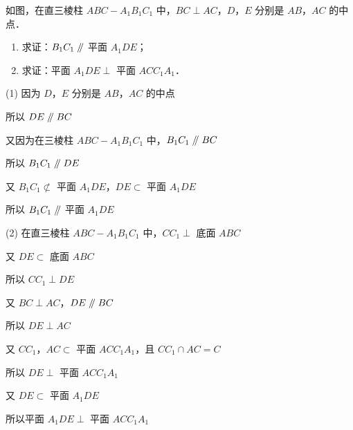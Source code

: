 \begin{example}[\bkstar{2}{5}]
如图，在直三棱柱 $ABC-A_1B_1C_1$ 中，$BC\perp AC$，$D$，$E$ 分别是 $AB$，$AC$ 的中点．
\begin{enumerate}
    \item[(1)] 求证：$B_1C_1\mathrel{/\mkern-5mu/}$ 平面 $A_1DE$；
    \item[(2)] 求证：平面 $A_1DE\perp$ 平面 $ACC_1A_1$．
\end{enumerate}
\end{example}
\begin{solution}
(1) 因为 $D$，$E$ 分别是 $AB$，$AC$ 的中点

所以 $DE\mathrel{/\mkern-5mu/} BC$

又因为在三棱柱 $ABC-A_1B_1C_1$ 中，$B_1C_1\mathrel{/\mkern-5mu/} BC$

所以 $B_1C_1\mathrel{/\mkern-5mu/} DE$

又 $B_1C_1\not\subset$ 平面 $A_1DE$，$DE\subset$ 平面 $A_1DE$

所以 $B_1C_1\mathrel{/\mkern-5mu/}$ 平面 $A_1DE$

(2) 在直三棱柱 $ABC-A_1B_1C_1$ 中，$CC_1\perp$ 底面 $ABC$

又 $DE\subset$ 底面 $ABC$

所以 $CC_1\perp DE$

又 $BC\perp AC$，$DE\mathrel{/\mkern-5mu/} BC$

所以 $DE\perp AC$

又 $CC_1$，$AC\subset$ 平面 $ACC_1A_1$，且 $CC_1\cap AC=C$

所以 $DE\perp$ 平面 $ACC_1A_1$

又 $DE\subset$ 平面 $A_1DE$

所以平面 $A_1DE\perp$ 平面 $ACC_1A_1$
\end{solution}

\vspace{2em}

